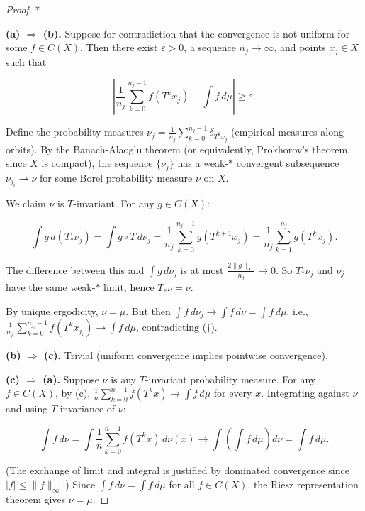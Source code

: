 \begin{proof}
*

\textbf{(a) $\Rightarrow$ (b).} Suppose for contradiction that the convergence is not uniform for some $f \in C(X)$. Then there exist $\varepsilon > 0$, a sequence $n_j \to \infty$, and points $x_j \in X$ such that

\begin{equation}\label{eq:dagger}\tag{$\dagger$}
\left|\frac{1}{n_j} \sum_{k=0}^{n_j - 1} f(T^k x_j) - \int f \, d\mu \right| \geq \varepsilon.
\end{equation}

Define the probability measures $\nu_j = \frac{1}{n_j}\sum_{k=0}^{n_j-1} \delta_{T^k x_j}$ (empirical measures along orbits). By the Banach-Alaoglu theorem (or equivalently, Prokhorov's theorem, since $X$ is compact), the sequence $\{\nu_j\}$ has a weak-$*$ convergent subsequence $\nu_{j_i} \rightharpoonup \nu$ for some Borel probability measure $\nu$ on $X$.

We claim $\nu$ is $T$-invariant. For any $g \in C(X)$:

\[
\int g \, d(T_* \nu_j) = \int g \circ T \, d\nu_j = \frac{1}{n_j}\sum_{k=0}^{n_j - 1} g(T^{k+1}x_j) = \frac{1}{n_j}\sum_{k=1}^{n_j} g(T^k x_j).
\]

The difference between this and $\int g \, d\nu_j$ is at most $\frac{2\|g\|_\infty}{n_j} \to 0$. So $T_* \nu_j$ and $\nu_j$ have the same weak-$*$ limit, hence $T_* \nu = \nu$.

By unique ergodicity, $\nu = \mu$. But then $\int f \, d\nu_j \to \int f \, d\nu = \int f \, d\mu$, i.e., $\frac{1}{n_{j_i}}\sum_{k=0}^{n_{j_i}-1} f(T^k x_{j_i}) \to \int f \, d\mu$, contradicting ($\dagger$).

\textbf{(b) $\Rightarrow$ (c).} Trivial (uniform convergence implies pointwise convergence).

\textbf{(c) $\Rightarrow$ (a).} Suppose $\nu$ is any $T$-invariant probability measure. For any $f \in C(X)$, by (c), $\frac{1}{n}\sum_{k=0}^{n-1} f(T^k x) \to \int f \, d\mu$ for every $x$. Integrating against $\nu$ and using $T$-invariance of $\nu$:

\[
\int f \, d\nu = \int \frac{1}{n}\sum_{k=0}^{n-1} f(T^k x) \, d\nu(x) \to \int \left(\int f \, d\mu\right) d\nu = \int f \, d\mu.
\]

(The exchange of limit and integral is justified by dominated convergence since $|f| \leq \|f\|_\infty$.) Since $\int f \, d\nu = \int f \, d\mu$ for all $f \in C(X)$, the Riesz representation theorem gives $\nu = \mu$.
\end{proof}



